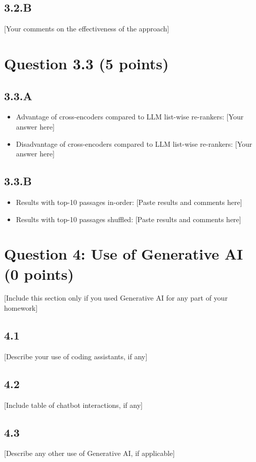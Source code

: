 \documentclass{article}
\begin{document}
\subsection*{3.2.B}

[Your comments on the effectiveness of the approach]

\section*{Question 3.3 (5 points)}

\subsection*{3.3.A}

\begin{itemize}
    \item Advantage of cross-encoders compared to LLM list-wise re-rankers: [Your answer here]
    \item Disadvantage of cross-encoders compared to LLM list-wise re-rankers: [Your answer here]
\end{itemize}

\subsection*{3.3.B}

\begin{itemize}
    \item Results with top-10 passages in-order:
    [Paste results and comments here]
    \item  Results with top-10 passages shuffled:
    [Paste results and comments here]
\end{itemize}

\section*{Question 4: Use of Generative AI (0 points)}

[Include this section only if you used Generative AI for any part of your homework]

\subsection*{4.1}

[Describe your use of coding assistants, if any]

\subsection*{4.2}

[Include table of chatbot interactions, if any]

\subsection*{4.3}

[Describe any other use of Generative AI, if applicable]
\end{document}
